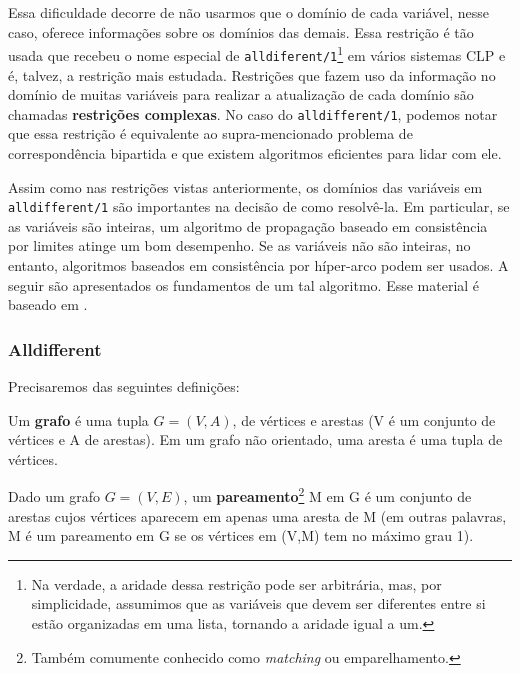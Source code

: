 \documentclass{article}
\begin{document}
Essa dificuldade decorre de não usarmos que o domínio de cada variável, nesse caso, oferece informações sobre os domínios das
demais. Essa restrição é tão usada que recebeu o nome especial de {\tt alldiferent/1}\footnote{Na verdade, a aridade dessa restrição pode ser arbitrária, mas, por simplicidade, assumimos que as variáveis que devem ser diferentes entre si estão organizadas em uma lista, tornando a aridade igual a um.} em vários sistemas CLP e é, talvez, a restrição mais estudada.
Restrições que fazem uso da informação no domínio de muitas variáveis para realizar a atualização de cada domínio são
chamadas \textbf{restrições complexas}. No caso do {\tt alldifferent/1}, %
podemos notar que essa restrição é equivalente ao
supra-mencionado problema de correspondência bipartida e que existem algoritmos eficientes para lidar com ele.

Assim como nas restrições vistas anteriormente, os domínios das variáveis em {\tt alldifferent/1} são importantes na decisão de como
resolvê-la. Em particular, se as variáveis são inteiras, um algoritmo de propagação baseado em consistência por limites atinge
um bom desempenho. Se as variáveis não são inteiras, no entanto, algoritmos baseados em consistência por híper-arco
podem ser usados. A seguir são apresentados os fundamentos de um tal algoritmo. Esse material é baseado em \cite{basileos}.

\subsubsection{Alldifferent}

Precisaremos das seguintes definições:

\begin{definition}
  Um \textbf{grafo} é uma tupla $G = (V,A)$, de vértices e arestas (V é um conjunto de vértices e A de arestas).
  Em um grafo não orientado, uma aresta é  uma tupla de vértices.
\end{definition}


Dado um grafo $G = (V,E)$, um \textbf{pareamento}\footnote{Também comumente conhecido como {\it matching} ou emparelhamento.} M em G é um conjunto de arestas cujos vértices aparecem em apenas uma aresta de M (em outras
palavras, M é um pareamento em G se os vértices em (V,M) tem no máximo grau 1).
\end{document}
